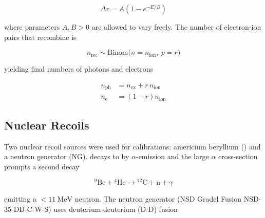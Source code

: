 \vspace{-10pt}

\begin{equation}
\Delta r = A(1 - e^{-E/B})
\label{eq:er_nr_calibrations_parameter_determ_er_rec_fluctuations}
\end{equation}

\noindent where parameters $A,B > 0$ are allowed to vary freely.  The number of electron-ion pairs that recombine is

\vspace{-15pt}

\begin{equation}
n_{\mathrm{rec}} \sim \mathrm{Binom} \big(n = n_{\mathrm{ion}},\ p = r \big)
\end{equation}

\noindent yielding final numbers of photons and electrons

\vspace{-30pt}

\begin{subequations}
\begin{align}
n_{\mathrm{ph}} &= n_{\mathrm{ex}} + r\, n_{\mathrm{ion}} \\
n_{\mathrm{e}} &= (1 - r) n_{\mathrm{ion}}
\end{align}
\end{subequations}



\subsection{Nuclear Recoils}
\label{subsec:er_nr_calibrations_parameter_determ_nr}
Two nuclear recoil sources were used for calibrations: americium beryllium () and a neutron generator
(NG).   decays to  by $\alpha$-emission and the large  $\alpha$ cross-section prompts a second decay

\vspace{-10pt}

\begin{equation}
\mathrm{^{9}Be} + \mathrm{^{4}He} \rightarrow \mathrm{^{12}C + n} + \gamma
\end{equation}

\noindent emitting a $< 11\ \mathrm{MeV}$ neutron.  The neutron generator (NSD Gradel Fusion NSD-35-DD-C-W-S) uses
deuterium-deuterium (D-D) fusion

\vspace{-10pt}

